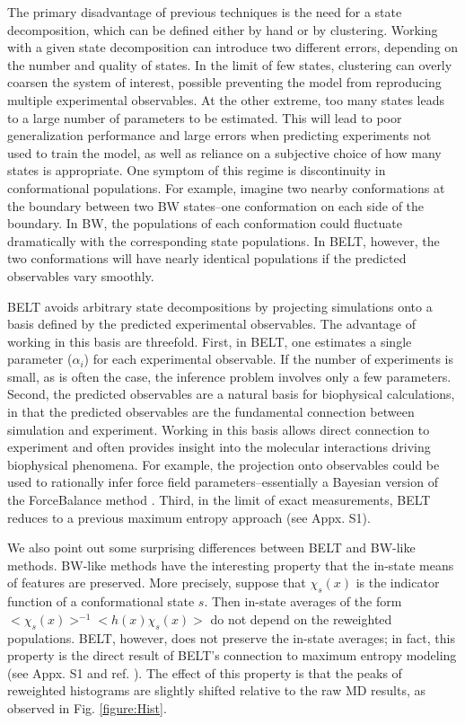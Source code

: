 \documentclass[11pt,titlepage]{article}
\begin{document}
The primary disadvantage of previous techniques is the need for a state decomposition, which can be defined either by hand or by clustering.  Working with a given state decomposition can introduce two different errors, depending on the number  and quality of states.  In the limit of few states, clustering can overly coarsen the system of interest, possible preventing the model from reproducing multiple experimental observables.  At the other extreme, too many states leads to a large number of parameters to be estimated. This will lead to poor generalization performance and large errors when predicting experiments not used to train the model, as well as reliance on a subjective choice of how many states is appropriate.  One symptom of this regime is discontinuity in conformational populations. For example, imagine two nearby conformations at the boundary between two BW states--one conformation on each side of the boundary.  In BW, the populations of each conformation could fluctuate dramatically with the corresponding 
state populations.  In BELT, however, the two conformations will have nearly identical populations if the predicted observables vary smoothly.

BELT avoids arbitrary state decompositions by projecting simulations onto a basis defined by the predicted experimental observables.  The advantage of working in this basis are threefold. First, in BELT, one estimates a single parameter ($\alpha_i$) for each experimental observable.  If the number of experiments is small, as is often the case, the inference problem involves only a few parameters.  Second, the predicted observables are a natural basis for biophysical calculations, in that the predicted observables are the fundamental connection between simulation and experiment.  Working in this basis allows direct connection to experiment and often provides insight into the molecular interactions driving biophysical phenomena.  For example, the projection onto observables could be used to rationally infer force field parameters--essentially a Bayesian version of the ForceBalance method  \citep{wang2012, wang2013systematic}.  Third, in the limit of exact measurements, BELT reduces to a previous  \citep{chodera2012} maximum entropy approach (see Appx. S1).  

We also point out some surprising differences between BELT and BW-like methods.  BW-like methods have the interesting property that the in-state means of features are preserved.  More precisely, suppose that $\chi_s(x)$ is the indicator function of a conformational state $s$.  Then in-state averages of the form $<\chi_s(x)>^{-1} <h(x) \chi_s(x)>$ do not depend on the reweighted populations.  BELT, however, does not preserve the in-state averages; in fact, this property is the direct result of BELT's connection to maximum entropy modeling (see Appx. S1 and ref.  \citep{chodera2012}).  The effect of this property is that the peaks of reweighted histograms are slightly shifted relative to the raw MD results, as observed in Fig. \ref{figure:Hist}.   
\end{document}
